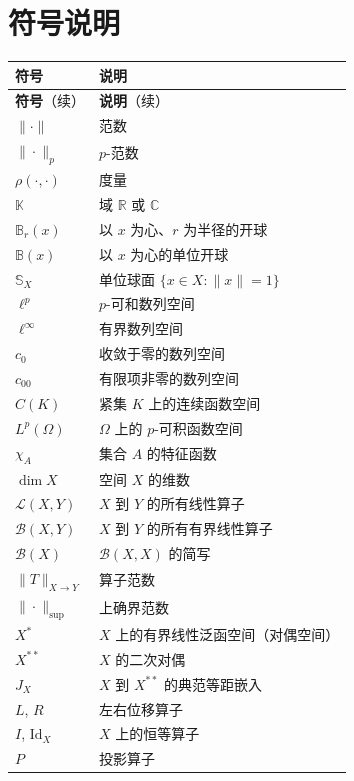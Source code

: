 \documentclass[UTF8]{ctexrep} %
\newcommand{\mb}[1]{\mathbb{#1}}
\newcommand{\mcal}[1]{\mathcal{#1}}
\begin{document}
\chapter*{符号说明}
{\small
\setlength{\tabcolsep}{6pt}
\renewcommand{\arraystretch}{1.2}
\begin{longtable}{p{3.2cm}p{\dimexpr\linewidth-3.4cm-4\tabcolsep\relax}}
\hline
\textbf{符号} & \textbf{说明} \\
\hline
\endfirsthead
\hline
\textbf{符号}（续） & \textbf{说明}（续） \\
\hline
\endhead
\hline
\endfoot
$\|\cdot\|$ & 范数 \\
$\|\cdot\|_p$ & $p$-范数 \\
$\rho(\cdot,\cdot)$ & 度量 \\
$\mb{K}$ & 域 $\mb{R}$ 或 $\mb{C}$ \\
$\mb{B}_r(x)$ & 以 $x$ 为心、$r$ 为半径的开球 \\
$\mb{B}(x)$ & 以 $x$ 为心的单位开球 \\
$\mb{S}_X$ & 单位球面 $\{x\in X:\|x\|=1\}$ \\
$\ell^p$ & $p$-可和数列空间 \\
$\ell^\infty$ & 有界数列空间 \\
$c_0$ & 收敛于零的数列空间 \\
$c_{00}$ & 有限项非零的数列空间 \\
$C(K)$ & 紧集 $K$ 上的连续函数空间 \\
$L^p(\Omega)$ & $\Omega$ 上的 $p$-可积函数空间 \\
$\chi_{A}$ & 集合 $A$ 的特征函数 \\
$\dim X$ & 空间 $X$ 的维数 \\ 
$\mcal{L}(X,Y)$ & $X$ 到 $Y$ 的所有线性算子 \\
$\mcal{B}(X,Y)$ & $X$ 到 $Y$ 的所有有界线性算子 \\
$\mcal{B}(X)$ & $\mcal{B}(X,X)$ 的简写 \\
$\|T\|_{X\to Y}$ & 算子范数 \\
$\|\cdot\|_{\sup}$ & 上确界范数 \\
$X^*$ & $X$ 上的有界线性泛函空间（对偶空间） \\
$X^{**}$ & $X$ 的二次对偶 \\
$J_X$ & $X$ 到 $X^{**}$ 的典范等距嵌入 \\
$L$, $R$ & 左右位移算子 \\
$I$, $\mathrm{Id}_X$ & $X$ 上的恒等算子 \\
$P$ & 投影算子 \\

\end{longtable}}
\end{document}

